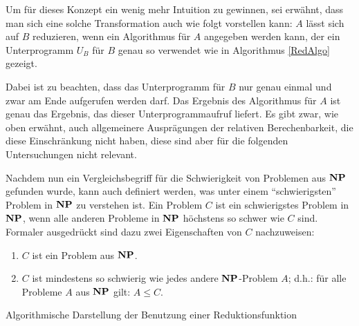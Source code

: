 Um für dieses Konzept ein wenig mehr Intuition zu gewinnen, sei
erwähnt, dass man sich eine solche Transformation auch wie folgt
vorstellen kann: $A$ lässt sich auf $B$ reduzieren, wenn ein
Algorithmus für $A$ angegeben werden kann, der ein Unterprogramm $U_B$
für $B$ genau so verwendet wie in Algorithmus \ref{RedAlgo} gezeigt.

Dabei ist zu beachten, dass das Unterprogramm für $B$ nur genau einmal
und zwar am Ende aufgerufen werden darf.  Das Ergebnis des Algorithmus
für $A$ ist genau das Ergebnis, das dieser Unterprogrammaufruf
liefert.  Es gibt zwar, wie oben erwähnt, auch allgemeinere
Ausprägungen der relativen Berechenbarkeit, die diese Einschränkung
nicht haben, diese sind aber für die folgenden Untersuchungen nicht
relevant.

Nachdem nun ein Vergleichsbegriff für die Schwierigkeit von Problemen
aus $\mathbf{N}\mathbf{P}$ gefunden wurde, kann auch definiert werden, was unter einem
"`schwierigsten"' Problem in $\mathbf{N}\mathbf{P}$ zu verstehen ist. Ein Problem $C$
ist ein schwierigstes Problem in $\mathbf{N}\mathbf{P}$, wenn alle anderen Probleme in
$\mathbf{N}\mathbf{P}$ höchstens so schwer wie $C$ sind. Formaler ausgedrückt sind dazu
zwei Eigenschaften von $C$ nachzuweisen:

\begin{enumerate}[{\sffamily(1)}]
\item $C$ ist ein Problem aus $\mathbf{N}\mathbf{P}$.
\item $C$ ist mindestens so schwierig wie jedes andere $\mathbf{N}\mathbf{P}$-Problem
$A$; d.h.: für alle Probleme $A$ aus $\mathbf{N}\mathbf{P}$ gilt: $A \le C$.
\end{enumerate}

\begin{algorithm}
\caption{Algorithmische Darstellung der Benutzung einer Reduktionsfunktion}
\label{RedAlgo}
%
\BlankLine
{}
\end{algorithm}

